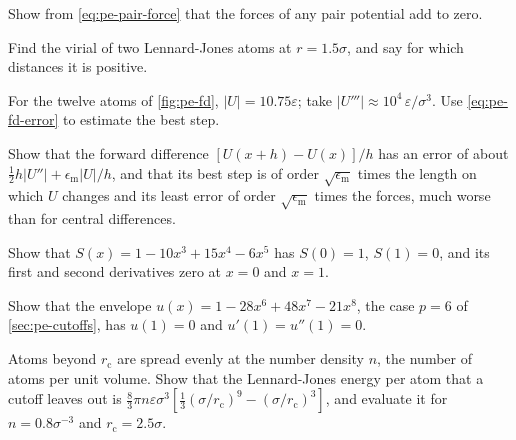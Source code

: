\begin{exercise}
\label{ex:pe-third}
Show from \cref{eq:pe-pair-force} that the forces of any pair potential
add to zero.
\end{exercise}

\begin{exercise}
\label{ex:pe-virial}
Find the virial of two Lennard-Jones atoms at $r = 1.5\sigma$, and say for
which distances it is positive.
\end{exercise}

\begin{exercise}
\label{ex:pe-best-step}
For the twelve atoms of \cref{fig:pe-fd}, $\lvert U\rvert =
10.75\varepsilon$; take $\lvert U'''\rvert \approx 10^4\,\varepsilon/
\sigma^3$. Use \cref{eq:pe-fd-error} to estimate the best step.
\end{exercise}

\begin{exercise}
\label{ex:pe-forward}
Show that the forward difference $[U(x + h) - U(x)]/h$ has an error of
about $\frac12 h\lvert U''\rvert + \epsilon_{\mathrm m}\lvert U\rvert/h$,
and that its best step is of order $\sqrt{\epsilon_{\mathrm m}}$ times
the length on which $U$ changes and its least error of order
$\sqrt{\epsilon_{\mathrm m}}$ times the forces, much worse than for
central differences.
\end{exercise}

\begin{exercise}
\label{ex:pe-switch}
Show that $S(x) = 1 - 10x^3 + 15x^4 - 6x^5$ has $S(0) = 1$, $S(1) = 0$,
and its first and second derivatives zero at $x = 0$ and $x = 1$.
\end{exercise}

\begin{exercise}
\label{ex:pe-envelope}
Show that the envelope $u(x) = 1 - 28x^6 + 48x^7 - 21x^8$, the case $p = 6$
of \cref{sec:pe-cutoffs}, has $u(1) = 0$ and $u'(1) = u''(1) = 0$.
\end{exercise}

\begin{exercise}
\label{ex:pe-tail}
Atoms beyond $r_{\mathrm c}$ are spread evenly at the number density
$n$, the number of atoms per unit volume.
Show that the Lennard-Jones energy per atom that a cutoff leaves out is
$\frac83\pi n\varepsilon\sigma^3[\frac13(\sigma/r_{\mathrm c})^9 -
(\sigma/r_{\mathrm c})^3]$, and evaluate it for $n = 0.8\sigma^{-3}$ and
$r_{\mathrm c} = 2.5\sigma$.
\end{exercise}

